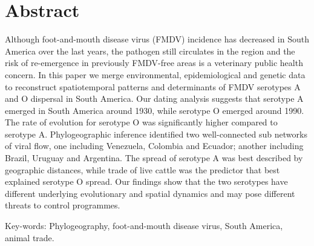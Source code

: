 \documentclass[10pt]{article}
\begin{document}
\section*{Abstract}
Although foot-and-mouth disease virus (FMDV) incidence has decreased in South America over the last years, the pathogen still circulates in the region and the risk of re-emergence in previously FMDV-free areas is a veterinary public health concern.
In this paper we merge environmental, epidemiological and genetic data to reconstruct spatiotemporal patterns and determinants of FMDV serotypes A and O dispersal in South America.
Our dating analysis suggests that serotype A emerged in South America around 1930, while serotype O emerged around 1990.
The rate of evolution for serotype O  was significantly higher compared to serotype A.
Phylogeographic inference identified two well-connected sub networks of viral flow, one including Venezuela, Colombia and Ecuador; another including Brazil, Uruguay and Argentina.
The spread of serotype A was best described by geographic distances, while trade of live cattle was the predictor that best explained serotype O spread.
Our findings show that the two serotypes have different underlying evolutionary and spatial dynamics and may pose different threats to control programmes.

Key-words: Phylogeography, foot-and-mouth disease virus, South America, animal trade.

\end{document}
